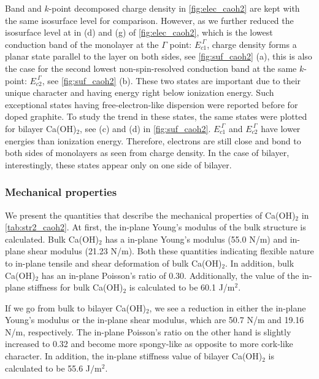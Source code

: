 Band and $k$-point decomposed charge density in \autoref{fig:elec_caoh2} are 
kept with the same isosurface level for comparison. However, as we further 
reduced the isosurface level at  in (d) and (g) of \autoref{fig:elec_caoh2}, which is the lowest conduction band of the 
monolayer at the $\Gamma$ point: $E_{c1}^{~\Gamma}$, charge density forms a planar 
state parallel to the layer on both sides, see \autoref{fig:suf_caoh2} (a), this
is also the case for the second lowest non-spin-resolved conduction band at the same
$k$-point: $E_{c2}^{~\Gamma}$, see \autoref{fig:suf_caoh2} (b). These two states are 
important due to their unique character and having energy right below ionization energy. Such exceptional states 
having free-electron-like dispersion were reported before\cite{Posternak1,Posternak2} for 
doped graphite. To study the trend in these states, the same states were plotted 
for bilayer Ca(OH)$_2$, see (c) and (d) in \autoref{fig:suf_caoh2}. $E_{c1}^{~\Gamma}$ and $E_{c2}^{~\Gamma}$ have lower energies than ionization energy. Therefore, electrons are still close and bond to both sides of monolayers as seen from charge density. In the case of bilayer, interestingly, these states appear only on one side of bilayer.

\subsubsection{Mechanical properties}

We present the quantities that describe the mechanical 
properties of Ca(OH)$_2$ in \autoref{tab:str2_caoh2}. 
At first, the in-plane Young's modulus of the bulk structure is calculated. 
Bulk Ca(OH)$_2$ has a in-plane Young's modulus (55.0 N/m) and in-plane shear 
modulus (21.23 N/m). Both these quantities indicating flexible nature to in-plane 
tensile and shear deformation of bulk Ca(OH)$_2$. In addition, bulk Ca(OH)$_2$ has 
an in-plane Poisson's ratio of 0.30.  Additionally, the value of the in-plane 
stiffness for bulk Ca(OH)$_{2}$ is calculated to be 60.1 J/m$^{2}$. 

If we go from bulk to bilayer Ca(OH)$_2$, we see a reduction in either the
in-plane Young's modulus or the in-plane shear modulus, which are 50.7 N/m and 
19.16 N/m, respectively. The in-plane Poisson's ratio on the other hand is 
slightly increased to 0.32 and become more spongy-like as opposite to more 
cork-like character\cite{poisson}. In addition, the in-plane stiffness value of 
bilayer Ca(OH)$_{2}$ is calculated to be 55.6 J$/$m$^{2}$. 

